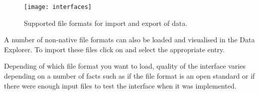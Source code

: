 \begin{figure}[tb]
\begin{center}
\texttt{[image: interfaces]}
\caption{Supported file formats for import and export of data.}
\label{fig:interfaces}
\end{center}
\end{figure}

A number of non-native file formats can also be loaded and visualised in the Data Explorer. To import these files click on  and select the appropriate entry.

Depending of which file format you want to load, quality of the interface varies depending on a number of facts such as if the file format is an open standard or if there were enough input files to test the interface when it was implemented.


